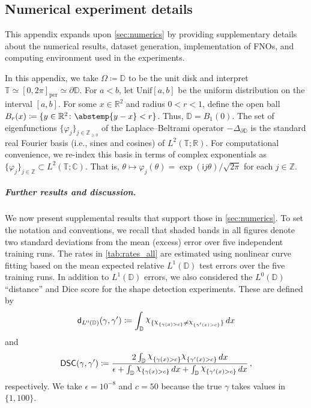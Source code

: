\documentclass[pdflatex,sn-mathphys-num]{sn-jnl-preprint}
\newcommand{\Z}{\mathbb{Z}}
\newcommand{\R}{\mathbb{R}}
\newcommand{\T}{\mathbb{T}}
\newcommand{\C}{\mathbb{C}}
\newcommand{\D}{\mathbb{D}}
\newcommand{\sfd}{\mathsf{d}}
\newcommand{\abs}{\abstemp}
\DeclareRobustCommand{\rchi}{{\mathpalette\irchi\relax}}
\newcommand{\irchi}[2]{\raisebox{\depth}{$#1\chi$}} %
\newcommand{\defeq}{\coloneqq} %
\newcommand{\Unif}{\mathrm{Unif}}
\newcommand{\diff}{d}
\newcommand{\dd}[1]{\,\diff{#1}}
\theoremstyle{thmstyleone}%
\theoremstyle{thmstyletwo}%
\theoremstyle{thmstylethree}%
\numberwithin{equation}{section}
\numberwithin{theorem}{section}
\begin{document}
\begin{appendices}
\section{Numerical experiment details}\label{app:numerics}
This appendix expands upon \cref{sec:numerics} by providing supplementary details about the numerical results, dataset generation, implementation of FNOs, and computing environment used in the experiments.

In this appendix, we take $\Omega\defeq\D$ to be the unit disk and interpret $\T\simeq[0, 2\pi]_{\mathrm{per}}\simeq\partial\D$. For $a<b$, let $\Unif[a,b]$ be the uniform distribution on the interval $[a,b]$. For some $x\in\R^2$ and radius $0<r<1$, define the open ball $B_r(x)\defeq\{y\in\R^2\colon \abs{y-x}<r\}$. Thus, $\D=B_1(0)$. The set of eigenfunctions $\{\varphi_j\}_{j\in\Z_{\geq 0}}$ of the Laplace--Beltrami operator $-\Delta_{\partial\D}$ is the standard real Fourier basis (i.e., sines and cosines) of $L^2(\T;\R)$. For computational convenience, we re-index this basis in terms of complex exponentials as $\{\varphi_j\}_{j\in\Z}\subset L^2(\T;\C)$. That is, $\theta\mapsto\varphi_j(\theta)=\exp(\mathsf{i}j\theta)/\sqrt{2\pi}$ for each $j\in\Z$.

\subparagraph*{\emph{\textbf{Further results and discussion.}}}
We now present supplemental results that support those in \cref{sec:numerics}. To set the notation and conventions, we recall that shaded bands in all figures denote two standard deviations from the mean (excess) error over five independent training runs. The rates in \cref{tab:rates_all} are estimated using nonlinear curve fitting based on the mean expected relative $L^1(\D)$ test errors over the five training runs. In addition to $L^1(\D)$ errors, we also considered the $L^0(\D)$ ``distance'' and Dice score for the shape detection experiments. These are defined by
\begin{align}
    \sfd_{L^0(\D)}(\gamma,\gamma')\defeq \int_{\D} \rchi_{\{\rchi_{\{\gamma(x)>c\}}\neq \rchi_{\{\gamma'(x)>c\}}\}} \dd{x}
\end{align}
and
\begin{align}
    \mathsf{DSC}(\gamma,\gamma')\defeq \frac{2\int_{\D}\rchi_{\{\gamma(x)>c\}}\rchi_{\{\gamma'(x)>c\}}\dd{x}}{\epsilon + \int_{\D}\rchi_{\{\gamma(x)>c\}}\dd{x} + \int_{\D}\rchi_{\{\gamma'(x)>c\}}\dd{x}}\,,
\end{align}
respectively. We take $\epsilon=10^{-8}$ and $c=50$ because the true $\gamma$ takes values in $\{1,100\}$.


\end{appendices}
\end{document}
